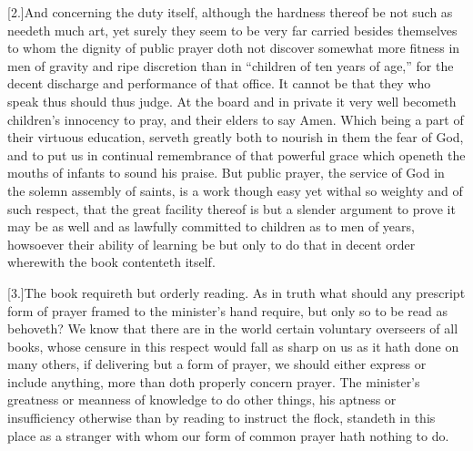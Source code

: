 [2.]And concerning the duty itself, although the hardness thereof be not such as needeth much art, yet surely they seem to be very far carried besides themselves to whom the dignity of public prayer doth not discover somewhat more fitness in men of gravity and ripe discretion than in “children of ten years of age,” for the decent discharge and performance of that office. It cannot be that they who speak thus should thus judge. At the board and in private it very well becometh children’s innocency to pray, and their elders to say Amen. Which being a part of their virtuous education, serveth greatly both to nourish in them the fear of God, and to put us in continual remembrance of that powerful grace which openeth the mouths of infants to sound his praise. But public prayer, the service of God in the solemn assembly of saints, is a work though easy yet withal so weighty and of such respect, that the great facility thereof is but a slender argument to prove it may be as well and as lawfully committed to children as to men of years, howsoever their ability of learning be but only to do that in decent order wherewith the book contenteth itself.

[3.]The book requireth but orderly reading. As in truth what should any prescript form of prayer framed to the minister’s hand require, but only so to be read as behoveth? We know that there are in the world certain voluntary overseers of all books, whose censure in this respect would fall as sharp on us as it hath done on many others, if delivering but a form of prayer, we should either express or include anything, more than doth properly concern prayer. The minister’s greatness or meanness of knowledge to do other things,  his aptness or insufficiency otherwise than by reading to instruct the flock, standeth in this place as a stranger with whom our form of common prayer hath nothing to do.

